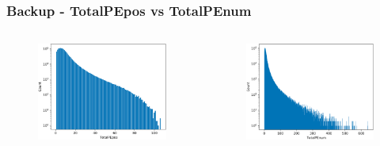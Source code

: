 \documentclass{beamer}
\begin{document}
\begin{frame}[noframenumbering]
\thispagestyle{empty}
\frametitle{Backup - TotalPEpos vs TotalPEnum}
\begin{columns}
\begin{figure}
    \centering
    \includegraphics[width=1.0\linewidth]{img/pepos.png}
\end{figure}
\begin{figure}
    \centering
    \includegraphics[width=1.0\linewidth]{img/penum.png}
\end{figure}
\end{columns}
\end{frame}
\end{document}
